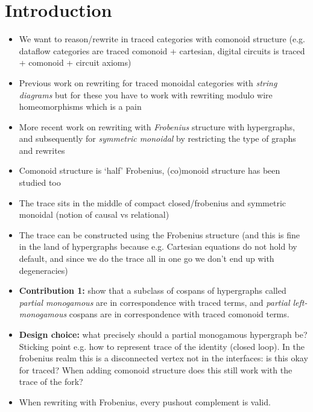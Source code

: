 \section{Introduction}

\begin{itemize}
    \item We want to reason/rewrite in traced categories with comonoid structure
            (e.g. dataflow categories are traced comonoid + cartesian,
            digital circuits is traced + comonoid + circuit axioms)
    \item Previous work on rewriting for traced monoidal categories with
            \emph{string diagrams} \cite{kissinger2012pictures,dixon2013opengraphs}
            but for these you have to work with rewriting modulo wire homeomorphisms
            which is a pain
    \item More recent work on rewriting with \emph{Frobenius} \cite{bonchi2022string}
            structure with hypergraphs, and subsequently for \emph{symmetric monoidal}
            by restricting the type of graphs and rewrites \cite{bonchi2021string}
    \item Comonoid structure is `half' Frobenius, (co)monoid structure has been studied
        too \cite{fritz2022free,milosavljevic2022string}
    \item The trace sits in the middle of compact closed/frobenius and symmetric
        monoidal (notion of causal vs relational)
    \item The trace can be constructed using the Frobenius structure (and this
        is fine in the land of hypergraphs because e.g. Cartesian equations do
        not hold by default, and since we do the trace all in one go we don't
        end up with degeneracies)
    \item \textbf{Contribution 1:} show that a subclass of cospans of hypergraphs
        called \emph{partial monogamous} are in correspondence with
        traced terms, and \emph{partial left-monogamous} cospans are in
        correspondence with traced comonoid terms.
    \item \textbf{Design choice:} what precisely should a partial monogamous
        hypergraph be? Sticking point e.g. how to represent trace of the
        identity (closed loop). In the frobenius realm this is a disconnected
        vertex not in the interfaces: is this okay for traced? When adding
        comonoid structure does this still work with the trace of the fork?
    \item When rewriting with Frobenius, every pushout complement is valid.

\end{itemize}
